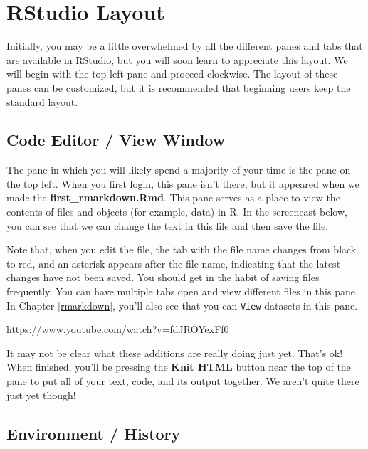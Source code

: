 \documentclass[]{tufte-book}
\begin{document}
\section{RStudio Layout}\label{rstudio-layout}

Initially, you may be a little overwhelmed by all the different panes and tabs that are available in RStudio, but you will soon learn to appreciate this layout. We will begin with the top left pane and proceed clockwise. The layout of these panes can be customized, but it is recommended that beginning users keep the standard layout.

\subsection{Code Editor / View Window}\label{code-editor-view-window}

The pane in which you will likely spend a majority of your time is the pane on the top left. When you first login, this pane isn't there, but it appeared when we made the \textbf{first\_rmarkdown.Rmd}. This pane serves as a place to view the contents of files and objects (for example, data) in R. In the screencast below, you can see that we can change the text in this file and then save the file.

Note that, when you edit the file, the tab with the file name changes from black to red, and an asterisk appears after the file name, indicating that the latest changes have not been saved. You should get in the habit of saving files frequently. You can have multiple tabs open and view different files in this pane. In Chapter \ref{rmarkdown}, you'll also see that you can \texttt{View} datasets in this pane.

\vspace{0.1in}\begin{center}\footnotesize{\url{https://www.youtube.com/watch?v=fdJROYexFf0}}\end{center}\vspace{0.1in}

It may not be clear what these additions are really doing just yet. That's ok! When finished, you'll be pressing the \textbf{Knit HTML} button near the top of the pane to put all of your text, code, and its output together. We aren't quite there just yet though!

\subsection{Environment / History}\label{environment-history}
\end{document}
